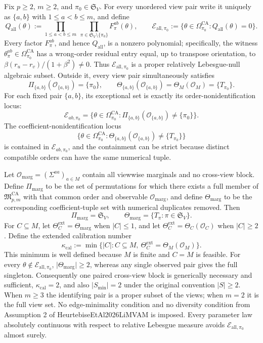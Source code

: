 Fix \(p\ge 2\), \(m\ge 2\), and \(\pi_0\in\mathfrak S_V\).  For every unordered view pair write it uniquely as \(\{a,b\}\) with \(1\le a<b\le m\), and define
\[
Q_{\mathrm{all}}(\theta)
:=
\prod_{1\le a<b\le m}\ \prod_{\pi\in\mathfrak S_V\setminus\{\pi_0\}}
F_\pi^{ab}(\theta),
\qquad
\mathcal E_{\mathrm{all},\pi_0}
:=
\{\theta\in\Omega_{\pi_0}^{\mathrm{CA}}:Q_{\mathrm{all}}(\theta)=0\}.
\]
Every factor \(F_\pi^{ab}\), and hence \(Q_{\mathrm{all}}\), is a nonzero polynomial; specifically, the witness \(\theta_\pi^{ab}\in\Omega_{\pi_0}^{\mathrm{CA}}\) has a wrong-order residual entry equal, up to transpose orientation, to \(\beta(r_u-r_v)/(1+\beta^2)\ne0\).  Thus \(\mathcal E_{\mathrm{all},\pi_0}\) is a proper relatively Lebesgue-null algebraic subset.  Outside it, every view pair simultaneously satisfies
\[
\Pi_{\{a,b\}}(\mathcal O_{\{a,b\}})=\{\pi_0\},
\qquad
\Theta_{\{a,b\}}(\mathcal O_{\{a,b\}})
=\Theta_M(\mathcal O_M)=\{T_{\pi_0}\}.
\]
For each fixed pair \(\{a,b\}\), its exceptional set is exactly its order-nonidentification locus:
\[
\mathcal E_{ab,\pi_0}
=
\{\theta\in\Omega_{\pi_0}^{\mathrm{CA}}:
\Pi_{\{a,b\}}(\mathcal O_{\{a,b\}})\ne\{\pi_0\}\}.
\]
The coefficient-nonidentification locus
\[
\{\theta\in\Omega_{\pi_0}^{\mathrm{CA}}:
\Theta_{\{a,b\}}(\mathcal O_{\{a,b\}})\ne\{T_{\pi_0}\}\}
\]
is contained in \(\mathcal E_{ab,\pi_0}\), and the containment can be strict because distinct compatible orders can have the same numerical tuple.

Let \(\mathcal O_{\mathrm{marg}}=(\Sigma^{aa})_{a\in M}\) contain all viewwise marginals and no cross-view block.  Define \(\Pi_{\mathrm{marg}}\) to be the set of permutations for which there exists a full member of \(\mathfrak M_{p,m}^{\mathrm{CA}}\) with that common order and observable \(\mathcal O_{\mathrm{marg}}\), and define \(\Theta_{\mathrm{marg}}\) to be the corresponding coefficient-tuple set with numerical duplicates removed.  Then
\[
\Pi_{\mathrm{marg}}=\mathfrak S_V,
\qquad
\Theta_{\mathrm{marg}}=\{T_\pi:\pi\in\mathfrak S_V\}.
\]
For \(C\subseteq M\), let \(\Theta_C^{\mathrm{ext}}=\Theta_{\mathrm{marg}}\) when \(\lvert C\rvert\le1\), and let \(\Theta_C^{\mathrm{ext}}=\Theta_C(\mathcal O_C)\) when \(\lvert C\rvert\ge2\).  Define the extended calibration number
\[
\kappa_{\mathrm{cal}}
:=
\min\{\lvert C\rvert:C\subseteq M,\ 
\Theta_C^{\mathrm{ext}}=\Theta_M(\mathcal O_M)\}.
\]
This minimum is well defined because \(M\) is finite and \(C=M\) is feasible.
For every \(\theta\notin\mathcal E_{\mathrm{all},\pi_0}\), \(\lvert\Theta_{\mathrm{marg}}\rvert\ge2\), whereas any single observed pair gives the full singleton.  Consequently one paired cross-view block is generically necessary and sufficient, \(\kappa_{\mathrm{cal}}=2\), and also \(\lvert S_{\min}\rvert=2\) under the original convention \(\lvert S\rvert\ge2\).  When \(m\ge3\) the identifying pair is a proper subset of the views; when \(m=2\) it is the full view set.  No edge-minimality condition and no diversity condition from Assumption 2 of HeurtebiseEtAl2026LiMVAM is imposed.  Every parameter law absolutely continuous with respect to relative Lebesgue measure avoids \(\mathcal E_{\mathrm{all},\pi_0}\) almost surely.

